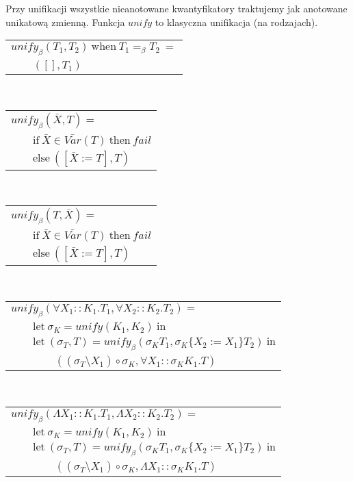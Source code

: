 \documentclass[11pt,leqno]{article}
\begin{document}
Przy unifikacji wszystkie nieanotowane kwantyfikatory traktujemy jak anotowane unikatową zmienną.
Funkcja $unify$ to klasyczna unifikacja (na rodzajach).\\
\begin{tabular}{l}
$unify_\beta(T_1, T_2) \ \textrm{when} \ T_1 =_\beta T_2 \ = $ \\
$\qquad ([], T_1)$ \\
\end{tabular} \\
\begin{tabular}{l}
$unify_\beta(\bar{X}, T) = $ \\
$\qquad \textrm{if} \ \bar{X} \in \bar{Var}(T) \ \textrm{then} \ fail $ \\
$\qquad \textrm{else} \ ([\bar{X} := T], T) $ \\
\end{tabular} \\
\begin{tabular}{l}
$unify_\beta(T, \bar{X}) = $ \\
$\qquad \textrm{if} \ \bar{X} \in \bar{Var}(T) \ \textrm{then} \ fail $ \\
$\qquad \textrm{else} \ ([\bar{X} := T], T) $ \\
\end{tabular} \\
\begin{tabular}{l}
$unify_\beta(\forall X_1::K_1.T_1, \forall X_2::K_2.T_2) = $ \\
$\qquad \textrm{let} \ \sigma_K = unify(K_1, K_2) \ \textrm{in} $ \\
$\qquad \textrm{let} \ (\sigma_T, T) = unify_\beta(\sigma_K T_1, \sigma_K \{X_2 := X_1\}T_2) \ \textrm{in} $ \\
$\qquad\qquad ((\sigma_T \setminus X_1) \circ \sigma_K, \forall X_1::\sigma_K K_1.T) $ \\
\end{tabular} \\
\begin{tabular}{l}
$unify_\beta(\Lambda X_1::K_1.T_1, \Lambda X_2::K_2.T_2) = $ \\
$\qquad \textrm{let} \ \sigma_K = unify(K_1, K_2) \ \textrm{in} $ \\
$\qquad \textrm{let} \ (\sigma_T, T) = unify_\beta(\sigma_K T_1, \sigma_K \{X_2 := X_1\}T_2) \ \textrm{in} $ \\
$\qquad\qquad ((\sigma_T \setminus X_1) \circ \sigma_K, \Lambda X_1::\sigma_K K_1.T) $ \\
\end{tabular} \\
\end{document}
